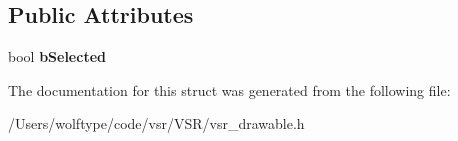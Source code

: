 \subsection*{Public Attributes}
\begin{DoxyCompactItemize}
\item 
\hypertarget{structvsr_1_1_touchable_a39f88bb2c210d4bec45a6f90c2561e07}{bool {\bfseries b\-Selected}}\label{structvsr_1_1_touchable_a39f88bb2c210d4bec45a6f90c2561e07}

\end{DoxyCompactItemize}


The documentation for this struct was generated from the following file\-:\begin{DoxyCompactItemize}
\item 
/\-Users/wolftype/code/vsr/\-V\-S\-R/vsr\-\_\-drawable.\-h\end{DoxyCompactItemize}
